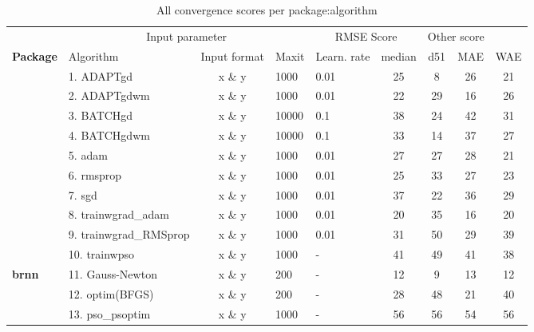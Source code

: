 \begin{Schunk}
\begin{table}

\caption{\label{tab:unnamed-chunk-8}All convergence scores per package:algorithm}
\centering
\fontsize{7}{9}\selectfont
\begin{tabular}[t]{>{\bfseries}llcllcccc}
\toprule
\multicolumn{2}{c}{ } & \multicolumn{3}{c}{Input parameter} & \multicolumn{2}{c}{RMSE Score} & \multicolumn{2}{c}{Other score} \\
\cmidrule(l{3pt}r{3pt}){3-5} \cmidrule(l{3pt}r{3pt}){6-7} \cmidrule(l{3pt}r{3pt}){8-9}
Package & Algorithm & Input format & Maxit & Learn. rate & median & d51 & MAE & WAE\\
\midrule
 & 1. ADAPTgd & x \& y & 1000 & 0.01 & 25 & 8 & 26 & 21\\

 & 2. ADAPTgdwm & x \& y & 1000 & 0.01 & 22 & 29 & 16 & 26\\

 & 3. BATCHgd & x \& y & 10000 & 0.1 & 38 & 24 & 42 & 31\\

\multirow{-4}{*}{\raggedright\arraybackslash AMORE} & 4. BATCHgdwm & x \& y & 10000 & 0.1 & 33 & 14 & 37 & 27\\
\cmidrule{1-9}
 & 5. adam & x \& y & 1000 & 0.01 & 27 & 27 & 28 & 21\\

 & 6. rmsprop & x \& y & 1000 & 0.01 & 25 & 33 & 27 & 23\\

\multirow{-3}{*}{\raggedright\arraybackslash ANN2} & 7. sgd & x \& y & 1000 & 0.01 & 37 & 22 & 36 & 29\\
\cmidrule{1-9}
 & 8. trainwgrad\_adam & x \& y & 1000 & 0.01 & 20 & 35 & 16 & 20\\

 & 9. trainwgrad\_RMSprop & x \& y & 1000 & 0.01 & 31 & 50 & 29 & 39\\

\multirow{-3}{*}{\raggedright\arraybackslash automl} & 10. trainwpso & x \& y & 1000 & - & 41 & 49 & 41 & 38\\
\cmidrule{1-9}
brnn & 11. Gauss-Newton & x \& y & 200 & - & 12 & 9 & 13 & 12\\
\cmidrule{1-9}
 & 12. optim(BFGS) & x \& y & 200 & - & 28 & 48 & 21 & 40\\

 & 13. pso\_psoptim & x \& y & 1000 & - & 56 & 56 & 54 & 56\\


\end{tabular}
\end{table}
\end{Schunk}
